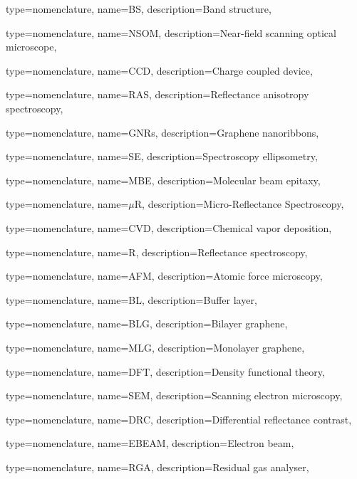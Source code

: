 {type={nomenclature},
name={BS},
description={Band structure},
}

{type={nomenclature},
name={NSOM},
description={Near-field scanning optical microscope},
}

{type={nomenclature},
name={CCD},
description={Charge coupled device},
}


{type={nomenclature},
name={RAS},
description={Reflectance anisotropy spectroscopy},
}

{type={nomenclature},
name={GNRs},
description={Graphene nanoribbons},
}

{type={nomenclature},
name={SE},
description={Spectroscopy ellipsometry},
}


{type={nomenclature},
name={MBE},
description={Molecular beam epitaxy},
}

{type={nomenclature},
name={$\mu$R},
description={Micro-Reflectance Spectroscopy},
}

{type={nomenclature},
name={CVD},
description={Chemical vapor deposition},
}

{type={nomenclature},
name={R},
description={Reflectance spectroscopy},
}

{type={nomenclature},
name={AFM},
description={Atomic force microscopy},
}

{type={nomenclature},
name={BL},
description={Buffer layer},
}

{type={nomenclature},
name={BLG},
description={Bilayer graphene},
}

{type={nomenclature},
name={MLG},
description={Monolayer graphene},
}

{type={nomenclature},
name={DFT},
description={Density functional theory},
}

{type={nomenclature},
name={SEM},
description={Scanning electron microscopy},
}


{type={nomenclature},
name={DRC},
description={Differential reflectance contrast},
}


{type={nomenclature},
name={EBEAM},
description={Electron beam},
}


{type={nomenclature},
name={RGA},
description={Residual gas analyser},
}



